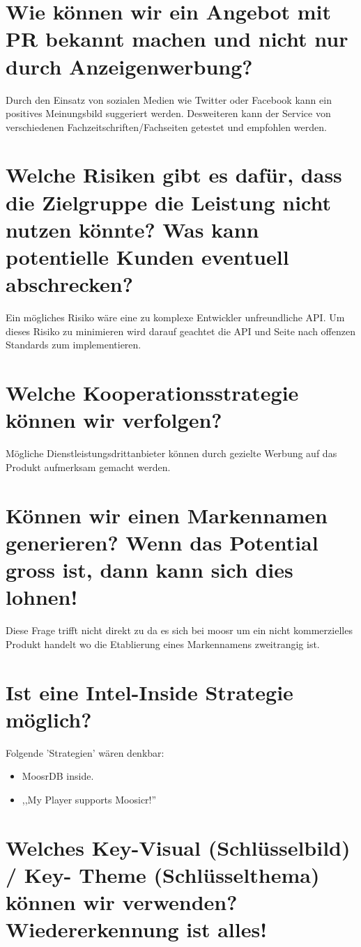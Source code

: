 \documentclass[11pt]{scrreprt}
\begin{document}
\section{Wie können wir ein Angebot mit PR bekannt
machen und nicht nur durch
Anzeigenwerbung?}

Durch den Einsatz von sozialen Medien wie Twitter oder Facebook kann ein
positives Meinungsbild suggeriert werden. Desweiteren kann der Service von
verschiedenen Fachzeitschriften/Fachseiten getestet und empfohlen werden.


\section{Welche Risiken gibt es dafür, dass die Zielgruppe
die Leistung nicht nutzen könnte?
Was kann potentielle Kunden eventuell
abschrecken?}
Ein mögliches Risiko wäre eine zu komplexe Entwickler unfreundliche API. Um
dieses Risiko zu minimieren wird darauf geachtet die API und Seite nach offenzen
Standards zum implementieren.

\section{Welche Kooperationsstrategie können wir
verfolgen?}
Mögliche Dienstleistungsdrittanbieter können durch gezielte Werbung auf das
Produkt aufmerksam gemacht werden.


\label{Markenname}\section{Können wir einen Markennamen generieren?
Wenn das Potential gross ist, dann kann sich
dies lohnen!}
Diese Frage trifft nicht direkt zu da es sich bei moosr um ein
nicht kommerzielles Produkt handelt wo die Etablierung eines Markennamens
zweitrangig ist. 

\section{Ist eine Intel-Inside Strategie möglich?}
Folgende 'Strategien' wären denkbar:
\begin{itemize}
    \item MoosrDB inside.
    \item ,,My Player supports Moosicr!''
\end{itemize}


\section{Welches Key-Visual (Schlüsselbild) / Key-
Theme (Schlüsselthema) können wir
verwenden? Wiedererkennung ist alles!}
\end{document}
